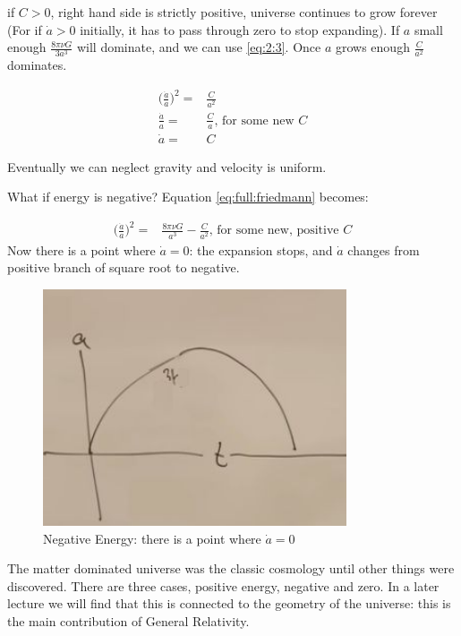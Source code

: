 \documentclass[]{article}
\begin{document}
if $C>0$, right hand side is strictly positive, universe continues to grow forever (For if $\dot{a}>0$ initially, it has to pass through zero to stop expanding). If $a$ small enough $\frac{8\pi\nu G}{3 a^3}$ will dominate, and we can use \eqref{eq:2:3}. Once $a$ grows enough $ \frac{C}{a^2}$ dominates.

\begin{align*}
	\big(\frac{\dot{a}}{a}\big)^2  =&  \frac{C}{a^2} \\
	\frac{\dot{a}}{a} =&  \frac{C}{a} \text{, for some new $C$}\\
	\dot{a} =& C
\end{align*}

Eventually we can neglect gravity and velocity is uniform.

What if energy is negative? Equation \eqref{eq:full:friedmann} becomes:

\begin{align*}
	\big(\frac{\dot{a}}{a}\big)^2  =& \frac{8\pi\nu G}{a^3} - \frac{C}{a^2} \text{, for some new, positive $C$}
\end{align*}
Now there is a point where $\dot{a}=0$: the expansion stops, and $\dot{a}$ changes from positive branch of square root to negative.

\begin{figure}[H]
	\caption{Negative Energy:  there is a point where $\dot{a}=0$}
	\includegraphics[width=0.8\textwidth]{cosmo-2-negative}
\end{figure}

The matter dominated universe was the classic cosmology until other things were discovered. There are three cases, positive energy, negative and zero. In a later lecture we will find that this is connected to the geometry of the universe: this is the main contribution of General Relativity.
\end{document}
